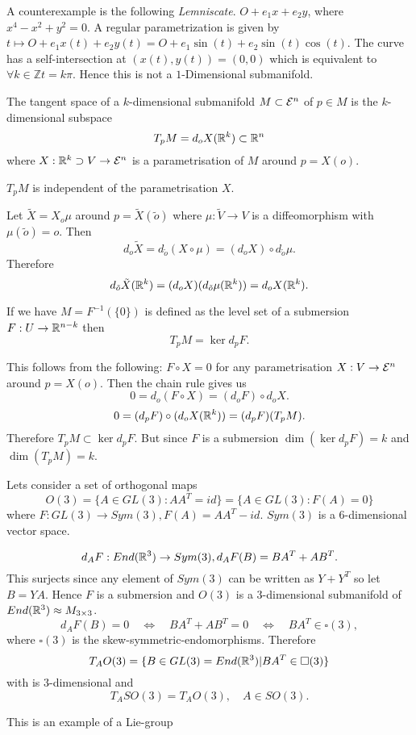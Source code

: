 \begin{example}
	A counterexample is the following \emph{Lemniscate}.
	$ O + e_1x + e_2y $, where $ x^4 - x^2 + y^2 = 0 $. A regular parametrization is given by $ t \mapsto O + e_1 x(t) + e_2 y(t) = O + e_1 \sin(t) + e_2\sin(t)\cos(t). $ 
	The curve has a self-intersection at $ (x(t),y(t))=(0,0) $ which is equivalent to $ \forall k \in \mathbb{Z} t = k\pi $. Hence this is not a $ 1$-Dimensional submanifold.
\end{example}

\begin{definition}
	The tangent space of a $k$-dimensional submanifold $M \subset \mathcal E^n$ of $p \in M$ is the $k$-dimensional subspace
		\[ T_pM = d_oX(\mathbb R^k) \subset \mathbb R^n \]
	where $X: \mathbb R^k \supset V  \to \mathcal E^n$ is a parametrisation of $M$ around $p=X(o)$.
\end{definition}

\begin{remark}
	$T_pM$ is independent of the parametrisation $X$.
	
	Let $\tilde X = X_o\mu$ around $p = \tilde X (\tilde o)$ where $\mu: \tilde V \to V $ is a diffeomorphism with $\mu(\tilde o)=o$. Then
		\[ d_o\tilde X = d_{\tilde o}(X \circ \mu) = (d_oX)\circ d_{\tilde o}\mu. \]
	Therefore
		\[ d_{\tilde o}\tilde X(\mathbb R^k) = (d_oX)(d_{\tilde o}\mu(\mathbb R^k)) = d_oX(\mathbb R^k). \]
\end{remark}

\begin{remark}
	If we have $M=F^{-1}(\{0\})$ is defined as the level set of a submersion $F: U \to \mathbb R^{n-k}$ then 
		\[ T_pM = \ker d_pF. \]
		
	This follows from the following: 
	$F \circ X=0$ for any parametrisation $X:V \to \mathcal E^n$ around $p=X(o)$. Then the chain rule gives us
		\[ 0 = d_o(F \circ X) = (d_oF)\circ d_oX. \]
		\[ 0= (d_pF)\circ (d_oX(\mathbb R^k)) = (d_pF)(T_pM). \]
	Therefore $T_pM \subset \ker d_pF$. But since $F$ is a submersion $\dim (\ker d_pF)=k$ and $\dim(T_pM)=k$.
\end{remark}

\begin{example}
	Lets consider a set of orthogonal maps 
		\[ O(3)=\{ A \in GL(3): AA^T = id \}
		= \{ A \in GL(3): F(A)=0 \} \]
	where $F: GL(3) \to Sym(3), F(A) = AA^T-id$. $ Sym(3) $ is a $6$-dimensional vector space.
	
		\[ d_AF: End(\mathbb R^3) \to Sym(3), d_AF(B) = BA^T + AB^T. \]
	This surjects since any element of $Sym(3)$ can be written as $Y+Y^T$ so let $B=YA$. Hence $F$ is a submersion and $O(3)$ is a $3$-dimensional submanifold of $End(\mathbb R^3) \approx M_{3 \times 3}$.
		\[ d_AF(B) = 0 \quad \Longleftrightarrow \quad
			BA^T + AB^T=0 \quad\Longleftrightarrow\quad
			BA^T \in \square(3), \]
	where $\square(3)$ is the skew-symmetric-endomorphisms. Therefore
		\[ T_AO(3) = \{ B \in GL(3)= End(\mathbb R^3) | BA^T \in \square(3) \} \]
	with is $3$-dimensional and
		\[ T_ASO(3) = T_AO(3), \quad A \in SO(3). \]
	
	This is an example of a Lie-group
\end{example}


